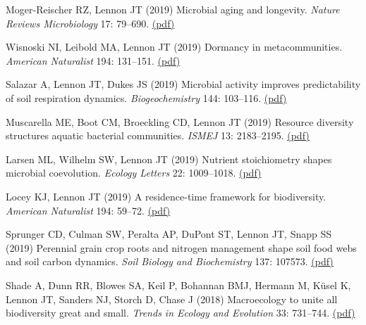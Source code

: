 \documentclass[11pt]{article}
\begin{document}
\begin{etaremune}
\item Moger-Reischer RZ, Lennon JT (2019) Microbial aging and longevity. \textit{Nature Reviews Microbiology} 17: 79--690. \href{https://lennonlab.github.io/assets/publications/Moger-Reischer_Lennon_2019.pdf}{(pdf)}

\item Wisnoski NI, Leibold MA, Lennon JT (2019) Dormancy in metacommunities. \textit{American Naturalist} 194: 131--151. \href{https://lennonlab.github.io/assets/publications/Wisnoski_etal_2019.pdf}{(pdf)}

\item Salazar A, Lennon JT, Dukes JS (2019) Microbial activity improves predictability of soil respiration dynamics. \textit{Biogeochemistry} 144: 103--116. \href{https://lennonlab.github.io/assets/publications/Salazar_etal_2019.pdf}{(pdf)}

\item Muscarella ME, Boot CM, Broeckling CD, Lennon JT (2019) Resource diversity structures aquatic bacterial communities. \textit{ISMEJ} 13: 2183--2195. \href{https://lennonlab.github.io/assets/publications/Muscarella_etal_2019.pdf}{(pdf)}

\item Larsen ML, Wilhelm SW, Lennon JT (2019) Nutrient stoichiometry shapes microbial coevolution. \textit{Ecology Letters} 22: 1009--1018. \href{https://lennonlab.github.io/assets/publications/Larsen_etal_2019.pdf}{(pdf)}

\item Locey KJ, Lennon JT (2019) A residence-time framework for biodiversity. \textit{American Naturalist} 194: 59--72. \href{https://lennonlab.github.io/assets/publications/Locey_Lennon_2019.pdf}{(pdf)}

\item Sprunger CD, Culman SW, Peralta AP, DuPont ST, Lennon JT, Snapp SS (2019) Perennial grain crop roots and nitrogen management shape soil food webs and soil carbon dynamics. \textit{Soil Biology and Biochemistry} 137: 107573. \href{https://lennonlab.github.io/assets/publications/Sprunger_etal_2019.pdf}{(pdf)}

\item Shade A, Dunn RR, Blowes SA, Keil P, Bohannan BMJ, Hermann M, Küsel K, Lennon JT, Sanders NJ, Storch D, Chase J (2018) Macroecology to unite all biodiversity great and small. \textit{Trends in Ecology and Evolution} 33: 731--744. \href{https://lennonlab.github.io/assets/publications/Shade_etal_2018.pdf}{(pdf)}


\end{etaremune}
\end{document}
